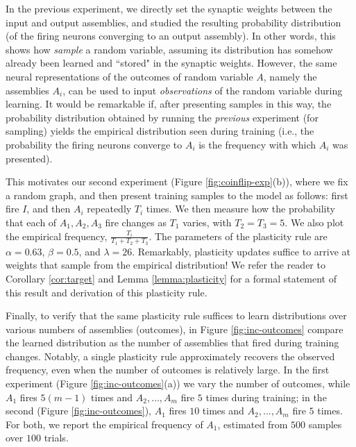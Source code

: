 \documentclass{article}
\theoremstyle{remark}
\newcommand{\1}{\mathbbm{1}}
\begin{document}
In the previous experiment, we directly set the synaptic weights between the input and output assemblies, and studied the resulting probability distribution (of the firing neurons converging to an output assembly). In other words, this shows how \emph{sample} a random variable, assuming its distribution has somehow already been learned and ``stored" in the synaptic weights. %
However, the same neural representations of the outcomes of random variable $A$, namely the assemblies $A_i$, can be used to input \emph{observations} of the random variable during learning. It would be remarkable if, after presenting samples in this way, the probability distribution obtained by running the \emph{previous} experiment (for sampling) yields the empirical distribution seen during training (i.e., the probability the firing neurons converge to $A_i$ is the frequency with which $A_i$ was presented).

This motivates our second experiment (Figure \ref{fig:coinflip-exp}(b)), where we fix a random graph, and then present training samples to the model as follows: first fire $I$, and then $A_i$ repeatedly $T_i$ times. We then measure how the probability that each of $A_1, A_2, A_3$ fire changes as $T_1$ varies, with $T_2 = T_3 = 5$. We also plot the empirical frequency, $\frac{T_i}{T_1 + T_2 + T_3}$. The parameters of the plasticity rule are $\alpha = 0.63$, $\beta = 0.5$, and $\lambda = 26$. Remarkably, plasticity updates suffice to arrive at weights that sample from the empirical distribution! We refer the reader to Corollary \ref{cor:target} and Lemma \ref{lemma:plasticity} for a formal statement of this result and derivation of this plasticity rule.

Finally, to verify that the same plasticity rule suffices to learn distributions over various numbers of assemblies (outcomes), in Figure \ref{fig:inc-outcomes} compare the learned distribution as the number of assemblies that fired during training changes. Notably, a single plasticity rule approximately recovers the observed frequency, even when the number of outcomes is relatively large. In the first experiment (Figure \ref{fig:inc-outcomes}(a)) we vary the number of outcomes, while $A_1$ fires $5(m-1)$ times and $A_2, \ldots, A_m$ fire $5$ times during training; in the second (Figure \ref{fig:inc-outcomes}), $A_1$ fires $10$ times and $A_2, \ldots, A_m$ fire $5$ times. For both, we report the empirical frequency of $A_1$, estimated from $500$ samples over $100$ trials.
\end{document}
